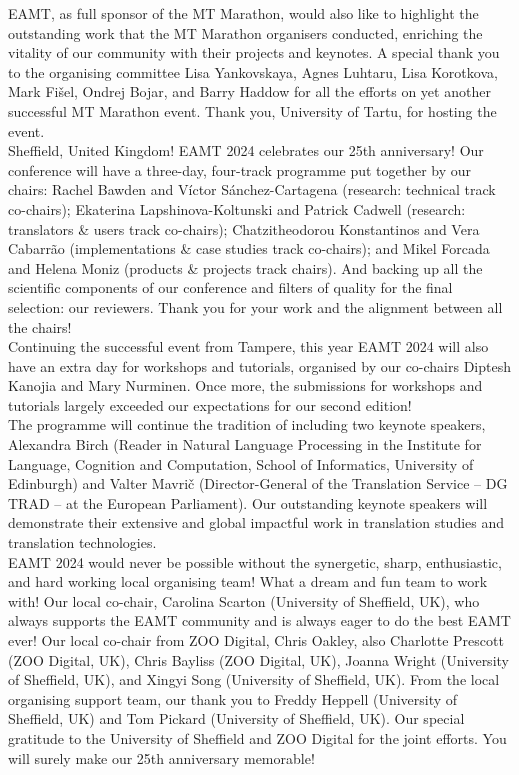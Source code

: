 EAMT, as full sponsor of the MT Marathon, would also like to highlight the outstanding work that the MT Marathon organisers conducted, enriching the vitality of our community with their projects and keynotes. A special thank you to the organising committee Lisa Yankovskaya, Agnes Luhtaru, Lisa Korotkova, Mark Fišel, Ondrej Bojar, and Barry Haddow for all the efforts on yet another successful MT Marathon event. Thank you, University of Tartu, for hosting the event.
\\

Sheffield, United Kingdom! EAMT 2024 celebrates our 25th anniversary! Our conference will have a three-day, four-track programme put together by our chairs: Rachel Bawden and Víctor Sánchez-Cartagena (research: technical track co-chairs); Ekaterina Lapshinova-Koltunski and Patrick Cadwell (research: translators \& users track co-chairs); Chatzitheodorou Konstantinos and Vera Cabarrão (implementations \& case studies track co-chairs); and Mikel Forcada and Helena Moniz (products \& projects track chairs). And backing up all the scientific components of our conference and filters of quality for the final selection: our reviewers. Thank you for your work and the alignment between all the chairs!
\\

Continuing the successful event from Tampere, this year EAMT 2024 will also have an extra day for workshops and tutorials, organised by our co-chairs Diptesh Kanojia and Mary Nurminen. Once more, the submissions for workshops and tutorials largely exceeded our expectations for our second edition!
\\

The programme will continue the tradition of including two keynote speakers, Alexandra Birch (Reader in Natural Language Processing in the Institute for Language, Cognition and Computation, School of Informatics, University of Edinburgh) and Valter Mavrič (Director-General of the Translation Service – DG TRAD – at the European Parliament). Our outstanding keynote speakers will demonstrate their extensive and global impactful work in translation studies and translation technologies.
\\

EAMT 2024 would never be possible without the synergetic, sharp, enthusiastic, and hard working local organising team! What a dream and fun team to work with! Our local co-chair, Carolina Scarton (University of Sheffield, UK), who always supports the EAMT community and is always eager to do the best EAMT ever! Our local co-chair from ZOO Digital, Chris Oakley, also Charlotte Prescott (ZOO Digital, UK), Chris Bayliss (ZOO Digital, UK), Joanna Wright (University of Sheffield, UK), and Xingyi Song (University of Sheffield, UK). From the local organising support team, our thank you to Freddy Heppell (University of Sheffield, UK) and Tom Pickard (University of Sheffield, UK). Our special gratitude to the University of Sheffield and ZOO Digital for the joint efforts. You will surely make our 25th anniversary memorable!
\\

